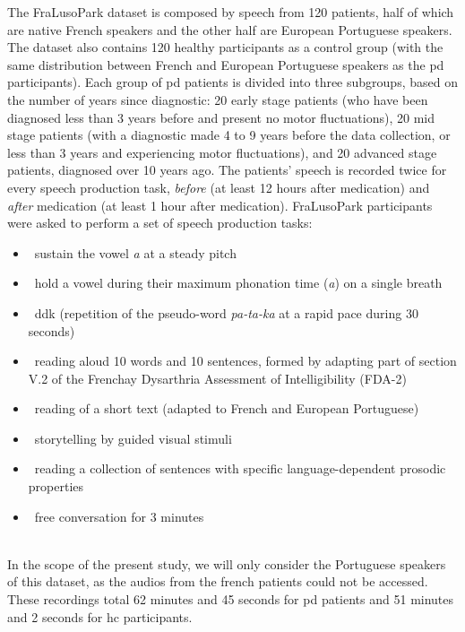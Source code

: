 The FraLusoPark dataset is composed by speech from 120 patients, half of which are native French speakers and the other half are European Portuguese speakers. The dataset also contains 120 healthy participants as a control group (with the same distribution between French and European Portuguese speakers as the \gls{pd} participants). Each group of \gls{pd} patients is divided into three subgroups, based on the number of years since diagnostic: 20 early stage patients (who have been diagnosed less than 3 years before and present no motor fluctuations), 20 mid stage patients (with a diagnostic made 4 to 9 years  before the data collection, or less than 3 years and experiencing motor fluctuations), and 20 advanced stage patients, diagnosed over 10 years ago. The patients' speech is recorded twice for every speech production task, \textit{before} (at least 12 hours after medication) and \textit{after} medication (at least 1 hour after medication). FraLusoPark participants were asked to perform a set of speech production tasks:

\begin{itemize}
	\item ~sustain the vowel \textit{\/a\/} at a steady pitch
	\item ~hold a vowel during their maximum phonation time (\textit{\/a\/}) on a single breath
	\item ~\gls{ddk} (repetition of the pseudo-word \textit{\/pa-ta-ka\/} at a rapid pace during 30 seconds)
	\item ~reading aloud 10 words and 10 sentences, formed by adapting part of section V.2 of the Frenchay Dysarthria Assessment of Intelligibility (FDA-2)
	\item ~reading of a short text (adapted to French and European Portuguese)
	\item ~storytelling by guided visual stimuli
	\item ~reading a collection of sentences with specific language-dependent prosodic properties
	\item ~free conversation for 3 minutes
	
\end{itemize}\\
In the scope of the present study, we will only consider the Portuguese speakers of this dataset, as the audios from the french patients could not be accessed. These recordings total 62 minutes and 45 seconds for \gls{pd} patients and 51 minutes and 2 seconds for \gls{hc} participants.

